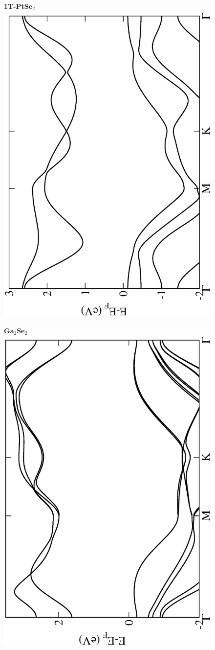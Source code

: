 \begin{figure}[htbp]
\centering
{\bfseries \sffamily 1T-PtSe$_{2}$}\\
\includegraphics[width=0.45\linewidth, angle=-90, trim={2.9cm, 0cm, 2cm, 0cm}, clip]{img/SI_figs/BS/1T-PtSe2.eps}
\end{figure}

\begin{figure}[htbp]
\centering
{\bfseries \sffamily Ga$_{2}$Se$_{2}$}\\
\includegraphics[width=0.45\linewidth, angle=-90, trim={2.9cm, 0cm, 2cm, 0cm}, clip]{img/SI_figs/BS/GaSe.eps}
\end{figure}

